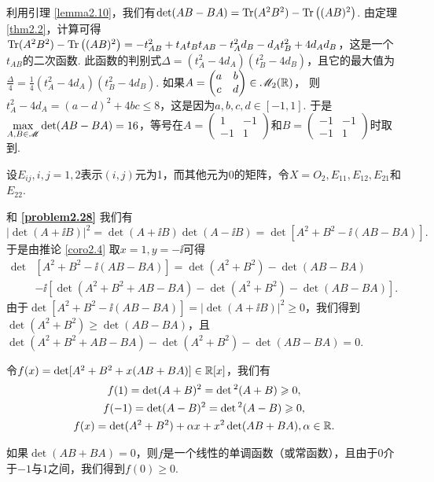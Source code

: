 \begin{solution}
  利用引理 \ref{lemma2.10}，我们有$\det(AB-BA)=\operatorname{Tr}(A^2B^2)-\operatorname{Tr}\big((AB)^2\big)$. 由定理 \ref{thm2.2}，计算可得$\operatorname{Tr}(A^2B^2)-\operatorname{Tr}
  \big((AB)^2\big)=-t_{AB}^2+t_At_Bt_{AB}-t_A^2d_B
  -d_At_B^2+4d_Ad_B$，这是一个$t_{AB}$的二次函数. 此函数的判别式$\varDelta=(t_A^2-4d_A)(t_B^2-4d_B)$，且它的最大值为$\frac{\varDelta}4=\frac14(t_A^2-4d_A)(t_B^2-4d_B)$. 如果$A=\begin{pmatrix}
    a & b \\
    c & d
  \end{pmatrix}\in\mathscr M_2(\mathbb R)$，
  则$t_A^2-4d_A=(a-d)^2+4bc\le8$，这是因为$a,b,c,d\in[-1,1]$. 于是$\max_{A,B\in\MM}\det(AB-BA)=16$，等号在$A=\begin{pmatrix}
    1 & -1 \\
    -1 & 1
  \end{pmatrix}$和$B=\begin{pmatrix}
    -1 & -1 \\
    -1 & 1
  \end{pmatrix}$时取到.
\end{solution}

\begin{solution}
  设$E_{ij},i,j=1,2$表示$(i,j)$元为1，而其他元为0的矩阵，令$X=O_2,E_{11},E_{12},E_{21}$和$E_{22}$.
\end{solution}

\begin{solution}\hspace*{-0.5em}
  和 \textbf{\ref{problem2.28}}\hspace*{0.5em}
    我们有
    \[
      |\det(A+\ii B)|^2 = \det(A + \ii B) \det(A - \ii B) = \det[A^2 + B^2 - \ii(AB - BA)].
    \]
    于是由推论 \ref{coro2.4} 取$x=1,y=-\ii$可得
    \begin{align*}
      \det &[A^2 + B^2 - \ii(AB - BA)] = \det(A^2 + B^2) - \det(AB - BA) \\
      &-\ii [\det(A^2 + B^2 + AB - BA) - \det(A^2 + B^2) - \det(AB - BA)].
    \end{align*}
    由于$\det[A^2 + B^2 - \ii(AB - BA)]=|\det(A+\ii B)|^2\ge0$，我们得到$\det(A^2+B^2)\ge\det(AB-BA)$，且$\det(A^2 + B^2 + AB - BA) - \det(A^2 + B^2) - \det(AB - BA)=0$.
\end{solution}

\setcounter{solution}{28}

\begin{solution}
  令$f(x)=\det[A^2+B^2+x(AB+BA)]\in\mathbb R[x]$，我们有
  \begin{gather*}
    f(1) = \det (A + B)^2 = \det{}^2(A + B) \geqslant0,\\
    f(-1) = \det (A - B)^2 = \det{}^2(A - B) \geqslant 0,\\
    f(x) = \det (A^2 + B^2) + \alpha x + x^2 \det(AB + BA),\alpha\in\mathbb R.
  \end{gather*}

  如果$\det(AB+BA)=0$，则$f$是一个线性的单调函数（或常函数），且由于$0$介于$-1$与$1$之间，我们得到$f(0)\ge0$.
\end{solution}

